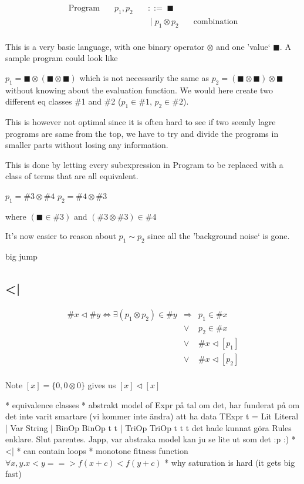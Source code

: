 \begin{equation*}
\begin{aligned}
\text{Program} \quad & p_1,p_2 \quad & ::= \; \blacksquare \\
 & & \; | \; p_1 \otimes p_2  & \quad \text{combination} \\
\end{aligned}
\end{equation*}

This is a very basic language, with one binary operator $\otimes$ and one 'value` $\blacksquare$. A sample program could look like

$p_1 = \blacksquare \otimes (\blacksquare \otimes \blacksquare)$
which is not necessarily the same as 
$p_2 = (\blacksquare \otimes \blacksquare) \otimes \blacksquare$
without knowing about the evaluation function. 
We would here create two different eq classes \#1 and \#2 ($p_1 \in \#1$, $p_2 \in \#2$).

This is however not optimal since it is often hard to see if two seemly lagre programs are same from the top, we have to try and divide the programs in smaller parts without losing any information.

This is done by letting every subexpression in Program to be replaced with a class of terms that are all equivalent.

$p_1 = \#3 \otimes \#4$
$p_2 = \#4 \otimes \#3$

where $(\blacksquare \in \#3)$ and $(\#3 \otimes \#3) \in \#4$

It's now easier to reason about $p_1 \sim p_2$ since all the 'background noise` is gone.


big jump


\subsection{<|}

\begin{equation*}
\begin{aligned}
\#x \lhd \#y \Leftrightarrow \exists (p_1 \otimes p_2) \in \#y &\Rightarrow& p_1 \in \#x \\
&\vee& p_2 \in \#x \\
&\vee& \#x \lhd [p_1] \\
&\vee& \#x \lhd [p_2] \\
\end{aligned}
\end{equation*}

Note $[x] = \{0, 0 \otimes 0\}$ gives us $[x] \lhd [x]$


* equivalence classes
* abstrakt model of Expr
på tal om det, har funderat på om det inte varit smartare (vi kommer inte ändra)
att ha data TExpr t = Lit Literal | Var String | BinOp BinOp t t | TriOp TriOp t t t
det hade kunnat göra Rules enklare. Slut parentes. Japp, var abstraka model kan ju se lite ut som det :p
:)
* <|
  * can contain loops
* monotone fitness function $\forall x,y. x < y ==> f (x + c) < f (y + c)$
* why saturation is hard (it gets big fast)


